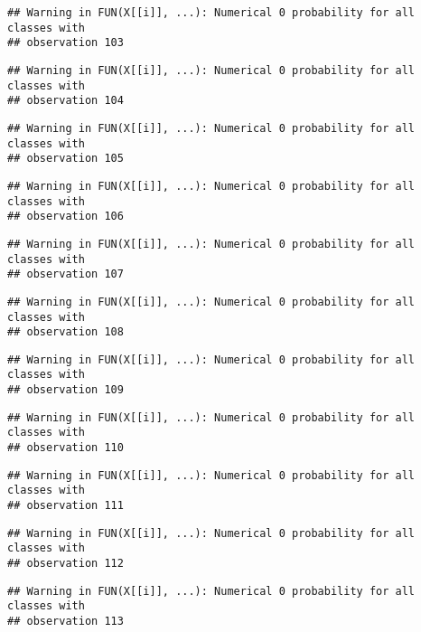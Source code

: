 \documentclass[
]{article}
\begin{document}
\begin{verbatim}
## Warning in FUN(X[[i]], ...): Numerical 0 probability for all classes with
## observation 103
\end{verbatim}

\begin{verbatim}
## Warning in FUN(X[[i]], ...): Numerical 0 probability for all classes with
## observation 104
\end{verbatim}

\begin{verbatim}
## Warning in FUN(X[[i]], ...): Numerical 0 probability for all classes with
## observation 105
\end{verbatim}

\begin{verbatim}
## Warning in FUN(X[[i]], ...): Numerical 0 probability for all classes with
## observation 106
\end{verbatim}

\begin{verbatim}
## Warning in FUN(X[[i]], ...): Numerical 0 probability for all classes with
## observation 107
\end{verbatim}

\begin{verbatim}
## Warning in FUN(X[[i]], ...): Numerical 0 probability for all classes with
## observation 108
\end{verbatim}

\begin{verbatim}
## Warning in FUN(X[[i]], ...): Numerical 0 probability for all classes with
## observation 109
\end{verbatim}

\begin{verbatim}
## Warning in FUN(X[[i]], ...): Numerical 0 probability for all classes with
## observation 110
\end{verbatim}

\begin{verbatim}
## Warning in FUN(X[[i]], ...): Numerical 0 probability for all classes with
## observation 111
\end{verbatim}

\begin{verbatim}
## Warning in FUN(X[[i]], ...): Numerical 0 probability for all classes with
## observation 112
\end{verbatim}

\begin{verbatim}
## Warning in FUN(X[[i]], ...): Numerical 0 probability for all classes with
## observation 113
\end{verbatim}
\end{document}
